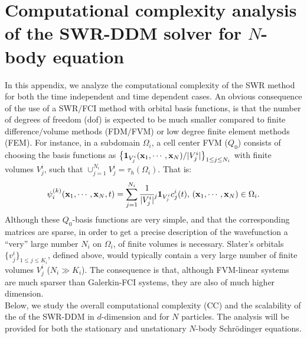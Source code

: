 \section{Computational complexity analysis of the SWR-DDM solver for $N$-body equation}\label{APXC}
\noindent In this appendix, we analyze the computational complexity of the SWR method for both the time independent and time dependent cases. An obvious consequence of the use of a SWR$/$FCI method with orbital basis functions, is that the number of degrees of freedom (dof) is expected to be much smaller compared to finite difference$/$volume methods (FDM$/$FVM) or low degree finite element methods (FEM). For instance, in a subdomain $\Omega_i$, a cell center FVM ($Q_0$) consists of choosing the basis functions as $\big\{{\bf 1}_{V^i_j}({\bf x}_1,\cdots,{\bf x}_N)/|V^i_j|\big\}_{1\leq j\leq N_i}$ with finite volumes $V^i_j$, such that $\cup_{j=1}^{N_i}V_j^i=\tau_h(\Omega_i)$. That is:
\begin{eqnarray*}
\psi_i^{(k)}({\bf x}_1,\cdots,{\bf x}_N,t) = \sum_{j=1}^{N_i}\cfrac{1}{|V^i_j|}_j{\bf 1}_{V_j^i}c^i_j(t), \, ({\bf x}_1,\cdots,{\bf x}_N) \in \Omega_i.
\end{eqnarray*}
Although these $Q_0$-basis functions are very simple, and that the corresponding matrices are sparse, in order to get a precise description of the wavefunction a ``very'' large number $N_i$ on $\Omega_i$, of finite volumes is necessary.  Slater's orbitals $\big\{v_j^i\big\}_{1\leq j\leq K_i}$, defined above, would typically contain a very large number of finite volumes $V_j^i$ ($N_i \gg K_i$). The consequence is that, although FVM-linear systems are much sparser than Galerkin-FCI systems, they are also of much higher dimension.\\
Below, we study the overall computational complexity (CC) and the scalability of the of the SWR-DDM in $d$-dimension and for $N$ particles. The analysis will be provided for both the stationary and unstationary $N$-body Schr\"odinger equations. \\
\\
